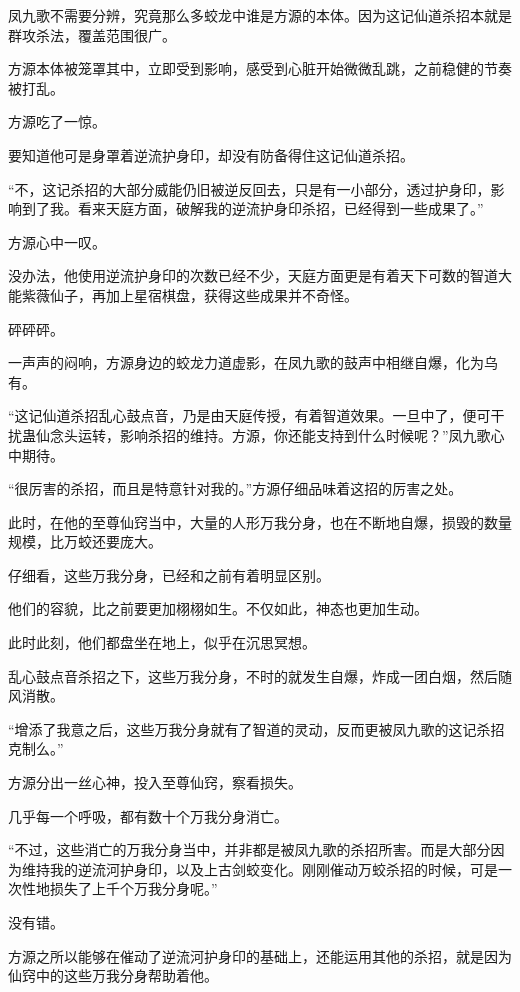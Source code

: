 \begin{this_body}
凤九歌不需要分辨，究竟那么多蛟龙中谁是方源的本体。因为这记仙道杀招本就是群攻杀法，覆盖范围很广。

方源本体被笼罩其中，立即受到影响，感受到心脏开始微微乱跳，之前稳健的节奏被打乱。

方源吃了一惊。

要知道他可是身罩着逆流护身印，却没有防备得住这记仙道杀招。

“不，这记杀招的大部分威能仍旧被逆反回去，只是有一小部分，透过护身印，影响到了我。看来天庭方面，破解我的逆流护身印杀招，已经得到一些成果了。”

方源心中一叹。

没办法，他使用逆流护身印的次数已经不少，天庭方面更是有着天下可数的智道大能紫薇仙子，再加上星宿棋盘，获得这些成果并不奇怪。

砰砰砰。

一声声的闷响，方源身边的蛟龙力道虚影，在凤九歌的鼓声中相继自爆，化为乌有。

“这记仙道杀招乱心鼓点音，乃是由天庭传授，有着智道效果。一旦中了，便可干扰蛊仙念头运转，影响杀招的维持。方源，你还能支持到什么时候呢？”凤九歌心中期待。

“很厉害的杀招，而且是特意针对我的。”方源仔细品味着这招的厉害之处。

此时，在他的至尊仙窍当中，大量的人形万我分身，也在不断地自爆，损毁的数量规模，比万蛟还要庞大。

仔细看，这些万我分身，已经和之前有着明显区别。

他们的容貌，比之前要更加栩栩如生。不仅如此，神态也更加生动。

此时此刻，他们都盘坐在地上，似乎在沉思冥想。

乱心鼓点音杀招之下，这些万我分身，不时的就发生自爆，炸成一团白烟，然后随风消散。

“增添了我意之后，这些万我分身就有了智道的灵动，反而更被凤九歌的这记杀招克制么。”

方源分出一丝心神，投入至尊仙窍，察看损失。

几乎每一个呼吸，都有数十个万我分身消亡。

“不过，这些消亡的万我分身当中，并非都是被凤九歌的杀招所害。而是大部分因为维持我的逆流河护身印，以及上古剑蛟变化。刚刚催动万蛟杀招的时候，可是一次性地损失了上千个万我分身呢。”

没有错。

方源之所以能够在催动了逆流河护身印的基础上，还能运用其他的杀招，就是因为仙窍中的这些万我分身帮助着他。


\end{this_body}

